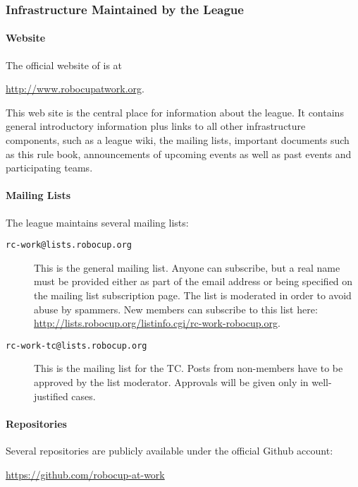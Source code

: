 \subsubsection{Infrastructure Maintained by the League}

\paragraph{Website}
The official website of \RCAW is at
\begin{center}
\url{http://www.robocupatwork.org}.	
\end{center}

This web site is the central place for information about the league. It contains general introductory information plus links to all other infrastructure components, such as a league wiki, the mailing lists, important documents such as this rule book, announcements of upcoming events as well as past events and participating teams.

\paragraph{Mailing Lists}
The league maintains several mailing lists:
\begin{description}
	\item[\texttt{rc-work@lists.robocup.org}] This is the general \RCAW mailing list. Anyone can subscribe, but a real name must be provided either as part of the email address or being specified on the mailing list subscription page. The list is moderated in order to avoid abuse by spammers. New members can subscribe to this list here: \url{http://lists.robocup.org/listinfo.cgi/rc-work-robocup.org}.

	\item[\texttt{rc-work-tc@lists.robocup.org}] This is the mailing list for the TC. Posts from non-members have to be approved by the list moderator. Approvals will be given only in well-justified cases.
\end{description}

\paragraph{Repositories}
Several repositories are publicly available under the official \RCAW Github account:
\begin{center}
\url{https://github.com/robocup-at-work}
\end{center}

